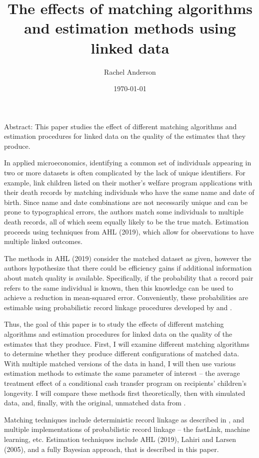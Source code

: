 \documentclass[12pt]{article}
\title{The effects of matching algorithms and estimation methods using linked data}
\author{Rachel Anderson}
\date{\today}
\begin{document}
\maketitle


Abstract: This paper studies the effect of different matching algorithms and estimation procedures for linked data on the quality of the estimates that they produce.  

In applied microeconomics, identifying a common set of individuals appearing in two or more datasets is often complicated by the lack of unique identifiers. For example,  \cite{CITE HERE} link children listed on their mother's welfare program applications with their death records by matching individuals who have the same name and date of birth.  Since name and date combinations are not necessarily unique and can be prone to typographical errors, the authors match some individuals to multiple death records, all of which seem equally likely to be the true match.  Estimation proceeds using techniques from AHL (2019), which allow for observations to have multiple linked outcomes.  

The methods in AHL (2019) consider the matched dataset as given, however the authors hypothesize that there could be efficiency gains if additional information about match quality is available.  Specifically, if the probability that a record pair refers to the same individual is known, then this knowledge can be used to achieve a reduction in mean-squared error.  Conveniently, these probabilities are estimable using probabilistic record linkage procedures developed by \cite{FellegiSunter} and \cite{Name}. 

Thus, the goal of this paper is to study the effects of different matching algorithms and estimation procedures for linked data on the quality of the estimates that they produce.  First, I will examine different matching algorithms to determine whether they produce different configurations of matched data.  With multiple matched versions of the data in hand, I will then use various estimation methods to estimate the same parameter of interest -- the average treatment effect of a conditional cash transfer program on recipients' children's longevity.   I will compare these methods first theoretically, then with simulated data, and, finally, with the original, unmatched data from \cite{}.   

Matching techniques include deterministic record linkage as described in \cite{}, and multiple implementations of probabilistic record linkage -- the fastLink, machine learning, etc. Estimation techniques include AHL (2019), Lahiri and Larsen (2005), and a fully Bayesian approach, that is described in this paper. 
\end{document}
